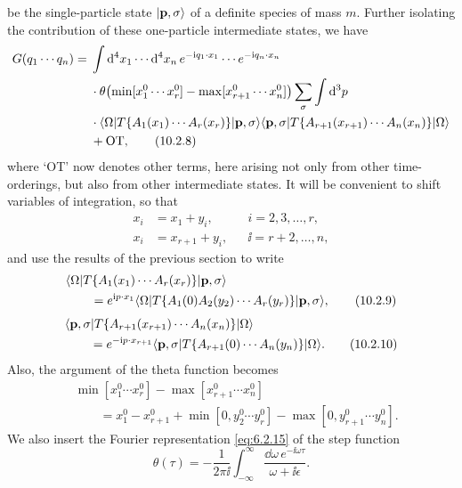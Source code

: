 


be the single-particle state $\lvert \mathbf p,\sigma\rangle$ of a definite species of mass $m$. Further
isolating the contribution of these one-particle intermediate states, we
have
\begin{align}
  G(q_1\cdots q_n)={}&\int \mathop{}\!\mathrm{d}^4x_1\cdots \mathop{}\!\mathrm{d}^4x_n\,
  e^{-\mathrm{i} q_1\cdot x_1}\cdots e^{-\mathrm{i} q_n\cdot x_n}
  \notag\\
  &\cdot\theta\!\left(\min[x_1^0\cdots x_r^0]
  -\max[x_{r+1}^0\cdots x_n^0]\right)
  \sum_\sigma\int \mathop{}\!\mathrm{d}^3p
  \notag\\
  &\cdot\langle \Omega\rvert T\{A_1(x_1)\cdots A_r(x_r)\}\lvert \mathbf p,\sigma\rangle
  \langle \mathbf p,\sigma\rvert T\{A_{r+1}(x_{r+1})\cdots A_n(x_n)\}\lvert \Omega\rangle
  \notag\\
  &+\mathrm{OT},
  \tag{10.2.8}\label{eq:10.2.8}
\end{align}
where `OT' now denotes other terms, here arising not only from other time-orderings,
but also from other intermediate states. It will be convenient
to shift variables of integration, so that
\[
  \begin{aligned}
    x_i&=x_1+y_i, &&i=2,3,\ldots,r,\\
    x_i&=x_{r+1}+y_i, &&\ii=r+2,\ldots,n,
  \end{aligned}
\]
and use the results of the previous section to write
\begin{align}
  &\langle \Omega\rvert T\{A_1(x_1)\cdots A_r(x_r)\}\lvert \mathbf p,\sigma\rangle
  \notag\\
  &\qquad=e^{\mathrm{i} p\cdot x_1}
  \langle \Omega\rvert T\{A_1(0)A_2(y_2)\cdots A_r(y_r)\}\lvert \mathbf p,\sigma\rangle,
  \tag{10.2.9}\label{eq:10.2.9}
\end{align}
\begin{align}
  &\langle \mathbf p,\sigma\rvert T\{A_{r+1}(x_{r+1})\cdots A_n(x_n)\}\lvert \Omega\rangle
  \notag\\
  &\qquad=e^{-\mathrm{i} p\cdot x_{r+1}}
  \langle \mathbf p,\sigma\rvert T\{A_{r+1}(0)\cdots A_n(y_n)\}\lvert \Omega\rangle.
  \tag{10.2.10}\label{eq:10.2.10}
\end{align}
Also, the argument of the theta function becomes
\begin{align*}
  &\min[x_1^0\cdots x_r^0]-\max[x_{r+1}^0\cdots x_n^0]
  \\
  &\qquad=x_1^0-x_{r+1}^0+\min[0,y_2^0\cdots y_r^0]
  -\max[0,y_{r+1}^0\cdots y_n^0].
\end{align*}
We also insert the Fourier representation \eqref{eq:6.2.15} of the step function
\[
  \theta(\tau)=-\frac{1}{2\pi \ii}\int_{-\infty}^{\infty}
  \frac{\dd\omega\,e^{-\ii\omega\tau}}{\omega+\ii\epsilon}.
\]
